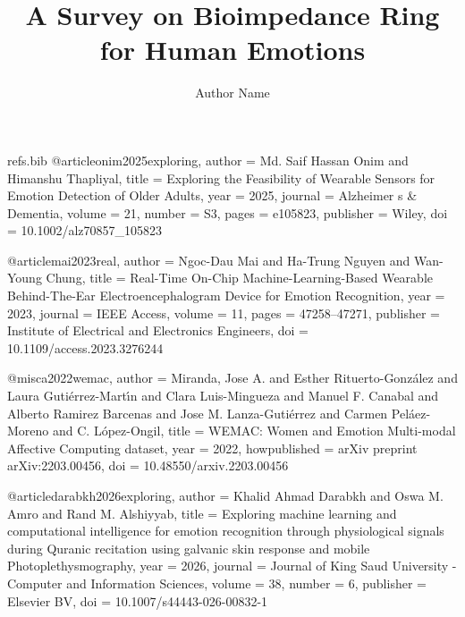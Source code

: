 \begin{filecontents*}[overwrite]{refs.bib}
@article{onim2025exploring,
  author = {Md. Saif Hassan Onim and Himanshu Thapliyal},
  title = {{Exploring the Feasibility of Wearable Sensors for Emotion Detection of Older Adults}},
  year = {2025},
  journal = {Alzheimer s \& Dementia},
  volume = {21},
  number = {S3},
  pages = {e105823},
  publisher = {Wiley},
  doi = {10.1002/alz70857_105823}
}

@article{mai2023real,
  author = {Ngoc-Dau Mai and Ha-Trung Nguyen and Wan{-}Young Chung},
  title = {{Real-Time On-Chip Machine-Learning-Based Wearable Behind-The-Ear Electroencephalogram Device for Emotion Recognition}},
  year = {2023},
  journal = {IEEE Access},
  volume = {11},
  pages = {47258--47271},
  publisher = {Institute of Electrical and Electronics Engineers},
  doi = {10.1109/access.2023.3276244}
}

@misc{a2022wemac,
  author = {Miranda, Jose A. and Esther Rituerto-Gonz{\'a}lez and Laura Guti{\'e}rrez-Mart{\'\i}n and Clara Luis-Mingueza and Manuel F. Canabal and Alberto Ramirez Barcenas and Jose M. Lanza-Guti{\'e}rrez and Carmen Pel{\'a}ez-Moreno and C. L{\'o}pez-Ongil},
  title = {{WEMAC: Women and Emotion Multi-modal Affective Computing dataset}},
  year = {2022},
  howpublished = {arXiv preprint arXiv:2203.00456},
  doi = {10.48550/arxiv.2203.00456}
}

@article{darabkh2026exploring,
  author = {Khalid Ahmad Darabkh and Oswa M. Amro and Rand M. Alshiyyab},
  title = {{Exploring machine learning and computational intelligence for emotion recognition through physiological signals during Quranic recitation using galvanic skin response and mobile Photoplethysmography}},
  year = {2026},
  journal = {Journal of King Saud University - Computer and Information Sciences},
  volume = {38},
  number = {6},
  publisher = {Elsevier BV},
  doi = {10.1007/s44443-026-00832-1}
}
\end{filecontents*}

\documentclass[journal]{IEEEtran}
\usepackage[utf8]{inputenc}
\usepackage[T1]{fontenc}
\usepackage{cite}
\usepackage{amsmath,amssymb}
\usepackage{graphicx}
\usepackage{booktabs}
\usepackage{tabularx}
\usepackage{array}
\usepackage{pgfplots}
\pgfplotsset{compat=1.17}
\usepackage[hidelinks]{hyperref}
\usepackage{url}


\title{A Survey on Bioimpedance Ring for Human Emotions}
\author{Author Name}
\maketitle

